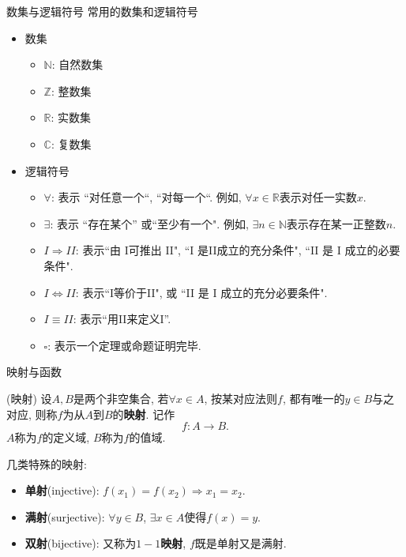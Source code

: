 \documentclass[fontset=windows, chinese, 10pt]{beamer}
\begin{document}
\begin{frame}{数集与逻辑符号}
  常用的数集和逻辑符号
  \begin{itemize}
      \item 数集
      \begin{itemize}
          \item $\mathbb{N}$: 自然数集
          \item $\mathbb{Z}$: 整数集
          \item $\mathbb{R}$: 实数集
          \item $\mathbb{C}$: 复数集
      \end{itemize}
      \item 逻辑符号
      \begin{itemize}
          \item $\forall$: 表示 ``对任意一个“, ``对每一个“. 例如, $\forall x \in \mathbb{R}$表示对任一实数$x$.
          \item $\exists$: 表示 ``存在某个” 或``至少有一个". 例如, $\exists n \in \mathbb{N}$表示存在某一正整数$n$.
          \item $I\Rightarrow II$: 表示``由 I可推出 II", ``I 是II成立的充分条件", ``II 是 I 成立的必要条件". 
          \item $I\Leftrightarrow II$: 表示``I等价于II", 或 ``II 是 I 成立的充分必要条件".
          \item $I \equiv II$: 表示``用II来定义I''.
          \item $\square$: 表示一个定理或命题证明完毕.
      \end{itemize}
  \end{itemize}
\end{frame}

\begin{frame}{映射与函数}
  \vspace{1em} 
  \begin{definition}{(映射)}
      设$A,B$是两个非空集合, 若$\forall x  \in A $, 按某对应法则$f$, 都有唯一的$y\in B$与之对应, 则称$f$为从$A$到$B$的\textbf{映射}. 
      记作
      \begin{equation}
          f: A \to B .
      \end{equation}
      $A$称为$f$的定义域, $B$称为$f$的值域.
  \end{definition}
  几类特殊的映射:
  \begin{itemize}
      \item \textbf{单射}(injective): $f(x_1) = f(x_2) \Rightarrow x_1 = x_2$.
      \item \textbf{满射}(surjective): $\forall y \in B$, $\exists x \in A$使得$f(x) = y$.
      \item \textbf{双射}(bijective): 又称为\textbf{$1-1$映射}, $f$既是单射又是满射.
  \end{itemize}
\end{frame}
\end{document}
